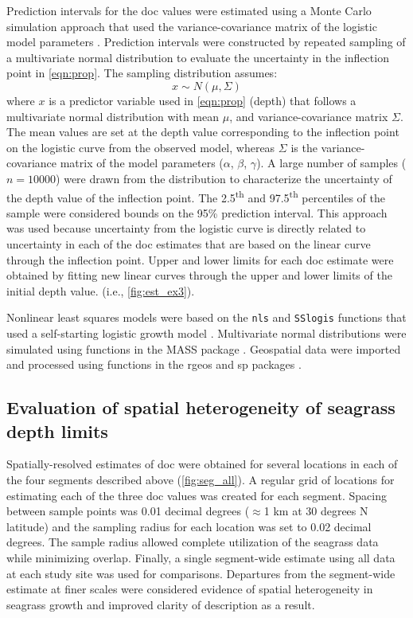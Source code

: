 \documentclass[letterpaper,12pt,oneside]{article}\usepackage[]{graphicx}\usepackage[]{color}
\begin{document}
Prediction intervals for the \ac{doc} values were estimated using a Monte Carlo simulation approach that used the variance-covariance matrix of the logistic model parameters \citep{Hilborn97}.  Prediction intervals were constructed by repeated sampling of a multivariate normal distribution to evaluate the uncertainty in the inflection point in \cref{eqn:prop}.  The sampling distribution assumes:
\begin{equation}
x \sim N(\mu, \Sigma)
\end{equation}
\noindent where $x$ is a predictor variable used in \cref{eqn:prop} (depth) that follows a multivariate normal distribution with mean $\mu$, and variance-covariance matrix $\Sigma$.  The mean values are set at the depth value corresponding to the inflection point on the logistic curve from the observed model, whereas $\Sigma$ is the variance-covariance matrix of the model parameters ($\alpha$, $\beta$, $\gamma$).  A large number of samples ($n = 10000$) were drawn from the distribution to characterize the uncertainty of the depth value of the inflection point.  The 2.5\textsuperscript{th} and 97.5\textsuperscript{th} percentiles of the sample were considered bounds on the 95\% prediction interval.  This approach was used because uncertainty from the logistic curve is directly related to uncertainty in each of the \ac{doc} estimates that are based on the linear curve through the inflection point. Upper and lower limits for each \ac{doc} estimate were obtained by fitting new linear curves through the upper and lower limits of the initial depth value. (i.e., \cref{fig:est_ex3}).

Nonlinear least squares models were based on the \texttt{nls} and \texttt{SSlogis} functions that used a self-starting logistic growth model \citep{Bates92,RDCT15}.  Multivariate normal distributions were simulated using functions in the MASS package \citep{Venables02}.  Geospatial data were imported and processed using functions in the rgeos and sp packages \citep{Bivand08,Bivand14}.  

\subsection{Evaluation of spatial heterogeneity of seagrass depth limits}

Spatially-resolved estimates of \ac{doc} were obtained for several locations in each of the four segments described above (\cref{fig:seg_all}).  A regular grid of locations for estimating each of the three \ac{doc} values was created for each segment.  Spacing between sample points was 0.01 decimal degrees ($\approx$1 km at 30 degrees N latitude) and the sampling radius for each location was set to 0.02 decimal degrees.  The sample radius allowed complete utilization of the seagrass data while minimizing overlap.  Finally, a single segment-wide estimate using all data at each study site was used for comparisons.  Departures from the segment-wide estimate at finer scales were considered evidence of spatial heterogeneity in seagrass growth and improved clarity of description as a result.  
\end{document}

